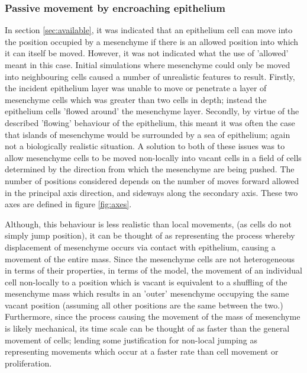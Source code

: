 \documentclass[pdftex,10pt,a4paper,twocolumn]{article}
\begin{document}
\subsubsection{Passive movement by encroaching epithelium}\label{sec:mespassive}
In section \ref{sec:available}, it was indicated that an epithelium cell can move into the position occupied by a mesenchyme if there is an allowed position into which it can itself be moved. However, it was not indicated what the use of 'allowed' meant in this case. Initial simulations where mesenchyme could only be moved into neighbouring cells caused a number of unrealistic features to result. Firstly, the incident epithelium layer was unable to move or penetrate a layer of mesenchyme cells which was greater than two cells in depth; instead the epithelium cells 'flowed around' the mesenchyme layer. Secondly, by virtue of the described 'flowing' behaviour of the epithelium, this meant it was often the case that islands of mesenchyme would be surrounded by a sea of epithelium; again not a biologically realistic situation. A solution to both of these issues was to allow mesenchyme cells to be moved non-locally into vacant cells in a field of cells determined by the direction from which the mesenchyme are being pushed. The number of positions considered depends on the number of moves forward allowed in the principal axis direction, and sideways along the secondary axis. These two axes are defined in figure \ref{fig:axes}. 

Although, this behaviour is less realistic than local movements, (as cells do not simply jump position), it can be thought of as representing the process whereby displacement of mesenchyme occurs via contact with epithelium, causing a movement of the entire mass. Since the mesenchyme cells are not heterogeneous in terms of their properties, in terms of the model, the movement of an individual cell non-locally to a position which is vacant is equivalent to a shuffling of the mesenchyme mass which results in an 'outer' mesenchyme occupying the same vacant position (assuming all other positions are the same between the two.) Furthermore, since the process causing the movement of the mass of mesenchyme is likely mechanical, its time scale can be thought of as faster than the general movement of cells; lending some justification for non-local jumping as representing movements which occur at a faster rate than cell movement or proliferation.
\end{document}
